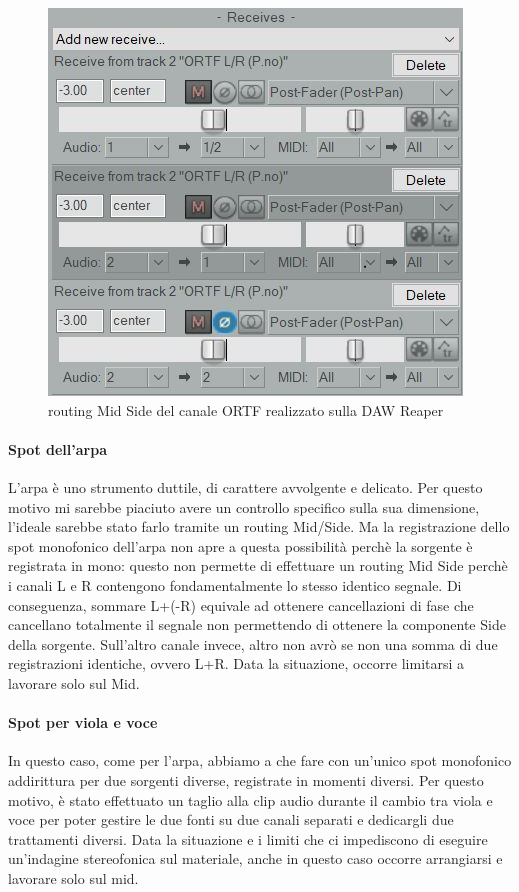 		\begin{figure}[h]
			\begin{center}
				\includegraphics[width = .50\textwidth]{img/image4.jpg}
				\caption{routing Mid Side del canale ORTF realizzato sulla DAW Reaper}
			\end{center}
		\end{figure}
		
		\paragraph{Spot dell'arpa} L'arpa è uno strumento duttile, di carattere avvolgente e delicato. Per questo motivo mi sarebbe piaciuto avere un controllo specifico sulla sua dimensione, l'ideale sarebbe stato farlo tramite un routing  Mid/Side. Ma la registrazione dello spot monofonico dell'arpa non apre a questa possibilità perchè la sorgente è registrata in mono: questo non permette di effettuare un routing Mid Side perchè i canali L e R contengono fondamentalmente lo stesso identico segnale. Di conseguenza, sommare L+(-R) equivale ad ottenere cancellazioni di fase che cancellano totalmente il segnale non permettendo di ottenere la componente Side della sorgente. Sull'altro canale invece, altro non avrò se non una somma di due registrazioni identiche, ovvero L+R. Data la situazione, occorre limitarsi a lavorare solo sul Mid.
	
\newpage
		
		\paragraph{Spot per viola e voce} In questo caso, come per l'arpa, abbiamo a che fare con un'unico spot monofonico addirittura per due sorgenti diverse, registrate in momenti diversi.
		Per questo motivo, è stato effettuato un taglio alla clip audio durante il cambio tra viola e voce per poter gestire le due fonti su due canali separati e dedicargli due trattamenti diversi.
		Data la situazione e i limiti che ci impediscono di eseguire un'indagine stereofonica sul materiale, anche in questo caso occorre arrangiarsi e lavorare solo sul mid.
	
